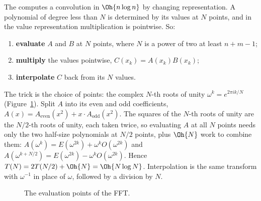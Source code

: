 The  computes a convolution in $\Oh{n \log n}$ by changing representation. A polynomial of degree less
than $N$ is determined by its values at $N$ points, and in the value representation multiplication is pointwise. So:
\begin{enumerate}
  \item \textbf{evaluate} $A$ and $B$ at $N$ points, where $N$ is a power of two at least $n + m - 1$;
  \item \textbf{multiply} the values pointwise, $C(x_k) = A(x_k) B(x_k)$;
  \item \textbf{interpolate} $C$ back from its $N$ values.
\end{enumerate}
The trick is the choice of points: the complex $N$-th roots of unity $\omega^k = e^{2\pi i k / N}$ (Figure~\ref{fig:roots}). Split $A$
into its even and odd coefficients, $A(x) = A_{\mathrm{even}}(x^2) + x \cdot A_{\mathrm{odd}}(x^2)$. The squares of the $N$-th roots of
unity are the $N/2$-th roots of unity, each taken twice, so evaluating $A$ at all $N$ points needs only the two half-size polynomials at
$N/2$ points, plus $\Oh{N}$ work to combine them: $A(\omega^k) = E(\omega^{2k}) + \omega^k O(\omega^{2k})$ and $A(\omega^{k + N/2}) =
E(\omega^{2k}) - \omega^k O(\omega^{2k})$. Hence $T(N) = 2T(N/2) + \Oh{N} = \Oh{N \log N}$. Interpolation is the same transform with
$\omega^{-1}$ in place of $\omega$, followed by a division by $N$.

\begin{figure}[htbp]
\centering
{}
\caption{The evaluation points of the FFT.}
\label{fig:roots}
\end{figure}

